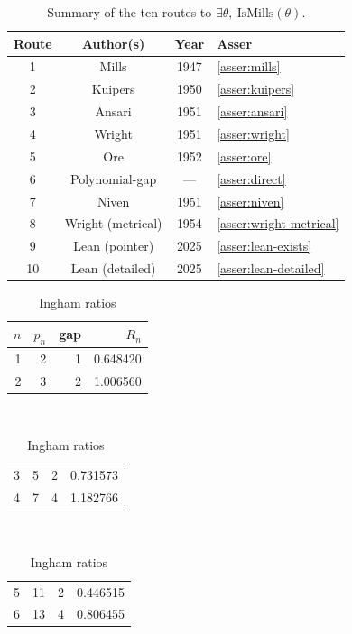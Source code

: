 \documentclass[11pt,reqno]{amsart}
\theoremstyle{blueplain}
\newcounter{asser}
\numberwithin{equation}{section}
\begin{document}
{\text{\ } \newline
\text{\ } \vspace{0.3in}\text{\ }

\begin{table}[H]
	\centering
	\caption{Summary of the ten routes to \(\exists\theta,\ \mathrm{IsMills}(\theta)\).}
	\label{tab:routes}
	{\small
		\begin{tabular}{|c|c|c|m{2.7cm}|}
			\hline
			\textbf{Route} & \textbf{Author(s)} & \textbf{Year} & \textbf{Asser} \\
			\hline
			1 & Mills & 1947 & \cref{asser:mills} \\ \hline
			2 & Kuipers & 1950 & \cref{asser:kuipers} \\ \hline
			3 & Ansari & 1951 & \cref{asser:ansari} \\ \hline
			4 & Wright & 1951 & \cref{asser:wright} \\ \hline
			5 & Ore & 1952 & \cref{asser:ore} \\ \hline
			6 & Polynomial-gap & --- & \cref{asser:direct} \\ \hline
			7 & Niven & 1951 & \cref{asser:niven} \\ \hline
			8 & Wright (metrical) & 1954 & \cref{asser:wright-metrical} \\ \hline
			9 & Lean (pointer) & 2025 & \cref{asser:lean-exists} \\ \hline
			10 & Lean (detailed) & 2025 & \cref{asser:lean-detailed} \\
			\hline
		\end{tabular}
	}
\end{table}


\text{\ } \newline
\text{\ } \vspace{0.3in}\text{\ }
\begin{table}[H]
	\centering
	\caption{ Ingham ratios}
	\begin{tabular}{rrrr}
		\toprule$n$ & $p_{n}$ & gap & $R_{n}$ \\ 
		\midrule1 & 2 & 1 & 0.648420 \\ 
		2 & 3 & 2 & 1.006560%
	\end{tabular}%
	\noindent \hspace{1em}\\[0pt]
	\noindent 
	\begin{tabular}{rrrr}
		3 & 5 & 2 & 0.731573 \\ 
		4 & 7 & 4 & 1.182766 \\ 
		
	\end{tabular}%
	\noindent \hspace{1em}\\[0pt]
	\noindent 
	\begin{tabular}{rrrr}
		5 & 11 & 2 & 0.446515 \\ 
		6 & 13 & 4 & 0.806455 \\ 
		

\end{tabular}
\end{table}}
\end{document}
